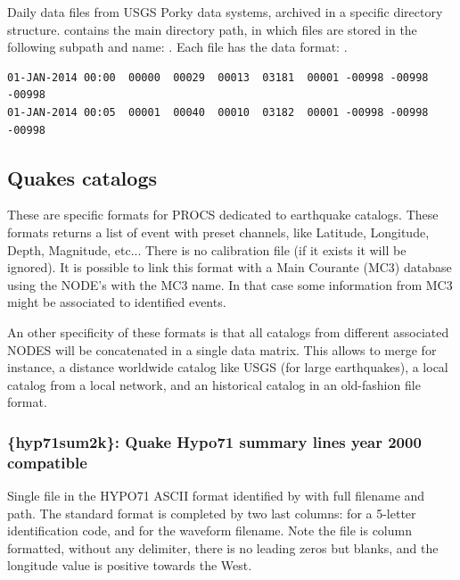 Daily data files from USGS Porky data systems, archived in a specific directory structure.  contains the main directory path, in which files are stored in the following subpath and name: . Each file has the data format: .

\begin{lstlisting}[language={},title=USGS Porky format example]
01-JAN-2014 00:00  00000  00029  00013  03181  00001 -00998 -00998 -00998
01-JAN-2014 00:05  00001  00040  00010  03182  00001 -00998 -00998 -00998
\end{lstlisting}

\subsection{Quakes catalogs}

These are specific formats for PROCS dedicated to earthquake catalogs. These formats returns a list of event with preset channels, like Latitude, Longitude, Depth, Magnitude, etc... There is no calibration file (if it exists it will be ignored). It is possible to link this format with a Main Courante (MC3) database using the NODE's  with the MC3 name. In that case some information from MC3 might be associated to identified events.

An other specificity of these formats is that all catalogs from different associated NODES will be concatenated in a single data matrix. This allows to merge for instance, a distance worldwide catalog like USGS (for large earthquakes), a local catalog from a local network, and an historical catalog in an old-fashion file format.

\subsubsection{\{hyp71sum2k\}: Quake Hypo71 summary lines year 2000 compatible}

Single file in the HYPO71 ASCII format identified by  with full filename and path. The standard format is completed by two last columns:  for a 5-letter identification code, and  for the waveform filename. Note the file is column formatted, without any delimiter, there is no leading zeros but blanks, and the longitude value is positive towards the West.


